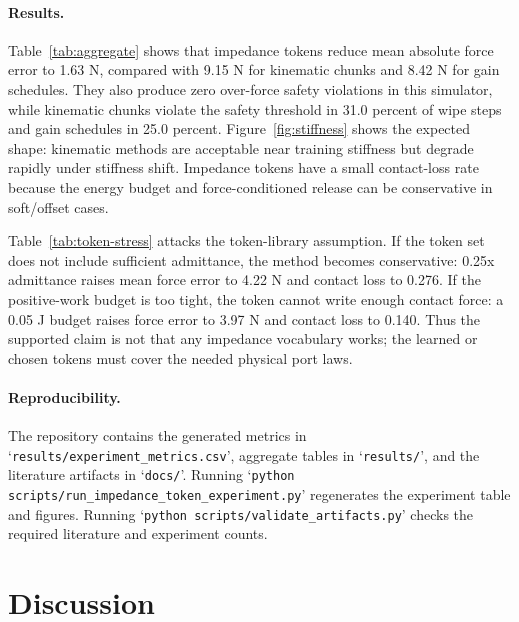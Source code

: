\documentclass{article}
\begin{document}
\paragraph{Results.}
Table~\ref{tab:aggregate} shows that impedance tokens reduce mean absolute force error to 1.63 N, compared with 9.15 N for kinematic chunks and 8.42 N for gain schedules. They also produce zero over-force safety violations in this simulator, while kinematic chunks violate the safety threshold in 31.0 percent of wipe steps and gain schedules in 25.0 percent. Figure~\ref{fig:stiffness} shows the expected shape: kinematic methods are acceptable near training stiffness but degrade rapidly under stiffness shift. Impedance tokens have a small contact-loss rate because the energy budget and force-conditioned release can be conservative in soft/offset cases.

\begin{table}[t]
\centering
\caption{V2 token-parameter stress for the impedance-token method. The baseline is the token used in Table~\ref{tab:aggregate}.}
\label{tab:token-stress}

\end{table}

Table~\ref{tab:token-stress} attacks the token-library assumption. If the token set
does not include sufficient admittance, the method becomes conservative: 0.25x
admittance raises mean force error to 4.22 N and contact loss to 0.276. If the
positive-work budget is too tight, the token cannot write enough contact force:
a 0.05 J budget raises force error to 3.97 N and contact loss to 0.140. Thus the
supported claim is not that any impedance vocabulary works; the learned or chosen
tokens must cover the needed physical port laws.

\paragraph{Reproducibility.}
The repository contains the generated metrics in `\texttt{results/experiment\_metrics.csv}', aggregate tables in `\texttt{results/}', and the literature artifacts in `\texttt{docs/}'. Running `\texttt{python scripts/run\_impedance\_token\_experiment.py}' regenerates the experiment table and figures. Running `\texttt{python scripts/validate\_artifacts.py}' checks the required literature and experiment counts.

\section{Discussion}
\end{document}
